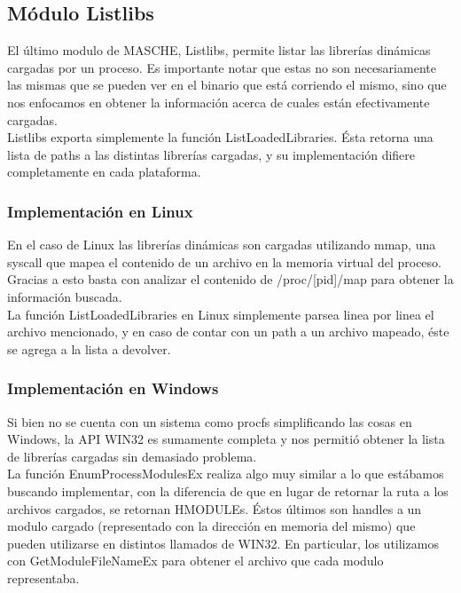 \subsection{Módulo Listlibs}

El último modulo de MASCHE, Listlibs, permite listar las librerías dinámicas
cargadas por un proceso. Es importante notar que estas no son necesariamente
las mismas que se pueden ver en el binario que está corriendo el mismo, sino
que nos enfocamos en obtener la información acerca de cuales están
efectivamente cargadas.\\

Listlibs exporta simplemente la función ListLoadedLibraries. Ésta retorna una
lista de paths a las distintas librerías cargadas, y su implementación difiere
completamente en cada plataforma.\\

\subsubsection{Implementación en Linux}

En el caso de Linux las librerías dinámicas son cargadas utilizando mmap, una
syscall que mapea el contenido de un archivo en la memoria virtual del proceso.
Gracias a esto basta con analizar el contenido de /proc/[pid]/map para obtener
la información buscada.\\

La función ListLoadedLibraries en Linux simplemente parsea linea por linea el
archivo mencionado, y en caso de contar con un path a un archivo mapeado, éste
se agrega a la lista a devolver.\\

\subsubsection{Implementación en Windows}

Si bien no se cuenta con un sistema como procfs simplificando las cosas en
Windows, la API WIN32 es sumamente completa y nos permitió obtener la lista de
librerías cargadas sin demasiado problema.\\

La función EnumProcessModulesEx realiza algo muy similar a lo que estábamos
buscando implementar, con la diferencia de que en lugar de retornar la ruta a
los archivos cargados, se retornan HMODULEs. Éstos últimos son handles a un
modulo cargado (representado con la dirección en memoria del mismo) que pueden
utilizarse en distintos llamados de WIN32. En particular, los utilizamos con
GetModuleFileNameEx para obtener el archivo que cada modulo representaba.\\

